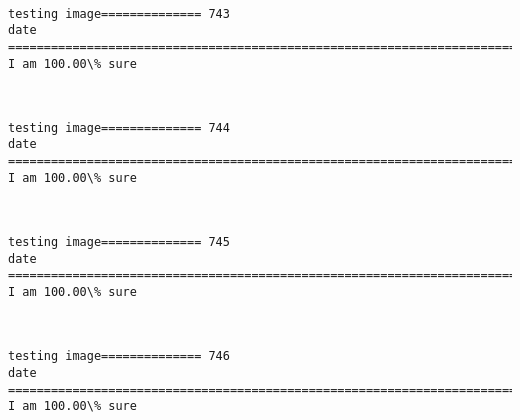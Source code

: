 \documentclass[11pt]{article}
\begin{document}
    \begin{center}
    \end{center}
    { \hspace*{\fill} \\}
    
    \begin{Verbatim}[commandchars=\\\{\}]
testing image============== 743
date
============================================================================
I am 100.00\% sure

    \end{Verbatim}

    \begin{center}
    \end{center}
    { \hspace*{\fill} \\}
    
    \begin{Verbatim}[commandchars=\\\{\}]
testing image============== 744
date
============================================================================
I am 100.00\% sure

    \end{Verbatim}

    \begin{center}
    \end{center}
    { \hspace*{\fill} \\}
    
    \begin{Verbatim}[commandchars=\\\{\}]
testing image============== 745
date
============================================================================
I am 100.00\% sure

    \end{Verbatim}

    \begin{center}
    \end{center}
    { \hspace*{\fill} \\}
    
    \begin{Verbatim}[commandchars=\\\{\}]
testing image============== 746
date
============================================================================
I am 100.00\% sure

    \end{Verbatim}
\end{document}
